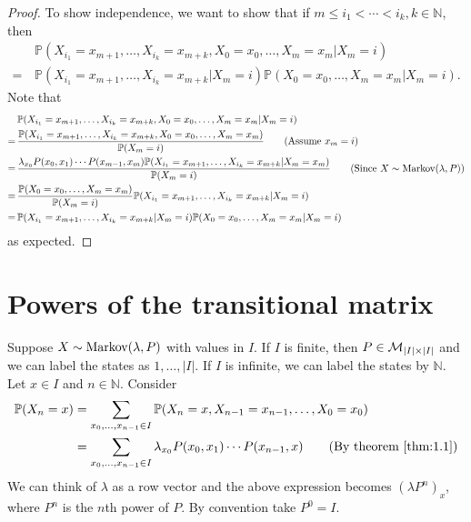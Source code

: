 \documentclass[a4paper,11pt]{article}
\begin{document}
\begin{proof}
    To show independence, we want to show that if $ m\le i_1<\cdots<i_k,k\in \mathbb{N}  $, then 
    \begin{align*}
        &\mathbb{P}(X_{i_1}=x_{m+1},\dots,X_{i_k}=x_{m+k},X_0=x_0,\dots,X_m=x_m|X_m=i)\tag{$*$}\\ 
        =\,& \mathbb{P}(X_{i_1}=x_{m+1},\dots,X_{i_k}=x_{m+k}|X_m=i)\mathbb{P}(X_0=x_0,\dots,X_m=x_m|X_m=i).
    \end{align*}
    Note that 
    \begin{align*}
        & \mathbb{P}(X_{i_1}=x_{m+1},\dots,X_{i_k}=x_{m+k},X_0=x_0,\dots,X_m=x_m|X_m=i)\\ 
        =\,& \frac{\mathbb{P}(X_{i_1}=x_{m+1},\dots,X_{i_k}=x_{m+k},X_0=x_0,\dots,X_m=x_m)}{\mathbb{P}(X_m=i)}\tag{Assume $ x_m=i $}\\ 
        =\,& \frac{\lambda_{x_0}P(x_0,x_1)\cdots P(x_{m-1},x_m)\mathbb{P}(X_{i_1}=x_{m+1},\dots,X_{i_k}=x_{m+k}|X_m=x_m)}{\mathbb{P}(X_m=i)}\tag{Since $ X\sim \Markov(\lambda,P) $}\\ 
        =\,& \frac{\mathbb{P}(X_0=x_0,\dots,X_m=x_m)}{\bbP(X_m=i)}\mathbb{P}(X_{i_1}=x_{m+1},\dots,X_{i_k}=x_{m+k}|X_m=i)\\ 
        =\,& \mathbb{P}(X_{i_1}=x_{m+1},\dots,X_{i_k}=x_{m+k}|X_m=i)\mathbb{P}(X_0=x_0,\dots,X_m=x_m|X_m=i)
    \end{align*}
    as expected.
\end{proof}

\section{Powers of the transitional matrix}
Suppose $ X \sim \operatorname{Markov}(\lambda,P) $ with values in $I$. If $I$ is finite, then $ P\in {\mathcal{M}}_{|I|\times |I|} $ and we can label the states as $1,\dots,|I|$. If $I$ is infinite, we can label the states by $ \mathbb{N} $. Let $x\in I$ and $n\in \mathbb{N}$. Consider 
\begin{align*}
    \mathbb{P}(X_n=x)&= \sum_{x_0,\dots,x_{n-1}\in I}\mathbb{P}(X_n=x,X_{n-1}=x_{n-1},\dots,X_0=x_0)\\ 
    &= \sum_{x_0,\dots,x_{n-1}\in I} \lambda_{x_0}P(x_0,x_1)\cdots P(x_{n-1},x)\tag{By theorem \ref{thm:1.1}}
\end{align*}
We can think of $\lambda$ as a row vector and the above expression becomes $ (\lambda P^n)_x $, where $P^n$ is the $n$th power of $P$. By convention take $P^0=I$.
\end{document}
